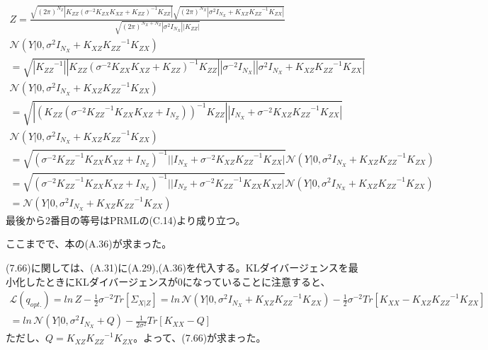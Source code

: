 \documentclass{jsarticle}
\begin{document}
\begin{equation}
\begin{split}
Z = \frac{\sqrt{(2\pi)^{N_Z}|{K_{ZZ}} (\sigma^{-2} K_{ZX} K_{XZ} + K_{ZZ})^{-1} {K_{ZZ}}|}\sqrt{(2\pi)^{N_X}|\sigma^2 I_{N_X} + K_{XZ}{K_{ZZ}}^{-1}K_{ZX}|}}{\sqrt{(2\pi)^{N_X + N_Z}|\sigma^2 I_{N_X}||K_{ZZ}|}}\\
\mathcal{N}(Y | 0, \sigma^2 I_{N_X} + K_{XZ}{K_{ZZ}}^{-1}K_{ZX})\\
=\sqrt{|{K_{ZZ}}^{-1}||{K_{ZZ}} (\sigma^{-2} K_{ZX} K_{XZ} + K_{ZZ})^{-1} {K_{ZZ}}||\sigma^{-2} I_{N_X}||\sigma^2 I_{N_X} + K_{XZ}{K_{ZZ}}^{-1}K_{ZX}|}\\
\mathcal{N}(Y | 0, \sigma^2 I_{N_X} + K_{XZ}{K_{ZZ}}^{-1}K_{ZX})\\
=\sqrt{|(K_{ZZ}(\sigma^{-2} {K_{ZZ}}^{-1}K_{ZX} K_{XZ} + I_{N_Z}))^{-1} {K_{ZZ}}||I_{N_X} + \sigma^{-2} K_{XZ}{K_{ZZ}}^{-1}K_{ZX}|}\\
\mathcal{N}(Y | 0, \sigma^2 I_{N_X} + K_{XZ}{K_{ZZ}}^{-1}K_{ZX})\\
=\sqrt{(\sigma^{-2} {K_{ZZ}}^{-1}K_{ZX} K_{XZ} + I_{N_Z})^{-1}||I_{N_X} + \sigma^{-2} K_{XZ}{K_{ZZ}}^{-1}K_{ZX}|}\mathcal{N}(Y | 0, \sigma^2 I_{N_X} + K_{XZ}{K_{ZZ}}^{-1}K_{ZX})\\
=\sqrt{(\sigma^{-2} {K_{ZZ}}^{-1}K_{ZX} K_{XZ} + I_{N_Z})^{-1}||I_{N_Z} + \sigma^{-2} {K_{ZZ}}^{-1}K_{ZX}K_{XZ}|}\mathcal{N}(Y | 0, \sigma^2 I_{N_X} + K_{XZ}{K_{ZZ}}^{-1}K_{ZX})\\
=\mathcal{N}(Y | 0, \sigma^2 I_{N_X} + K_{XZ}{K_{ZZ}}^{-1}K_{ZX})
\end{split}
\end{equation}
最後から2番目の等号はPRMLの(C.14)より成り立つ。

ここまでで、本の(A.36)が求まった。

(7.66)に関しては、(A.31)に(A.29),(A.36)を代入する。KLダイバージェンスを最小化したときにKLダイバージェンスが0になっていることに注意すると、
\begin{equation}
\begin{split}
\mathcal{L}(q_{opt.}) = ln \, Z - \frac{1}{2}\sigma^{-2}Tr[\Sigma_{X|Z}]
= ln \, \mathcal{N}(Y | 0, \sigma^2 I_{N_X} + K_{XZ}{K_{ZZ}}^{-1}K_{ZX}) - \frac{1}{2}\sigma^{-2}Tr[K_{XX} - K_{XZ}{K_{ZZ}}^{-1}K_{ZX}]\\
= ln \, \mathcal{N}(Y | 0, \sigma^2 I_{N_X} + Q) - \frac{1}{2\sigma^2}Tr[K_{XX} - Q]
\end{split}
\end{equation}
ただし、$Q = K_{XZ}{K_{ZZ}}^{-1}K_{ZX}$。よって、(7.66)が求まった。
\end{document}
